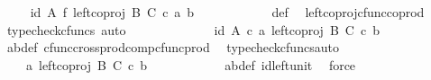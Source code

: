 \begin{isabellebody}
\ \isamarkupfalse%
\ {\isachardoublequoteopen}{\isachardot}{\kern0pt}{\isachardot}{\kern0pt}{\isachardot}{\kern0pt}\ {\isacharequal}{\kern0pt}\ {\isacharparenleft}{\kern0pt}id\ A\ {\isasymtimes}\isactrlsub f\ left{\isacharunderscore}{\kern0pt}coproj\ B\ C{\isacharparenright}{\kern0pt}\ {\isasymcirc}\isactrlsub c\ {\isasymlangle}a{\isacharprime}{\kern0pt}{\isacharcomma}{\kern0pt}\ b{\isacharprime}{\kern0pt}{\isasymrangle}{\isachardoublequoteclose}\isanewline
\ \ \ \ \ \ \ \ \ \ \isamarkupfalse%
\ {\isasymphi}{\isacharunderscore}{\kern0pt}def\ \isamarkupfalse%
\ left{\isacharunderscore}{\kern0pt}coproj{\isacharunderscore}{\kern0pt}cfunc{\isacharunderscore}{\kern0pt}coprod\ \isamarkupfalse%
\ {\isacharparenleft}{\kern0pt}typecheck{\isacharunderscore}{\kern0pt}cfuncs{\isacharcomma}{\kern0pt}\ auto{\isacharparenright}{\kern0pt}\isanewline
\ \ \ \ \ \ \ \ \isamarkupfalse%
\ \isamarkupfalse%
\ {\isachardoublequoteopen}{\isachardot}{\kern0pt}{\isachardot}{\kern0pt}{\isachardot}{\kern0pt}\ {\isacharequal}{\kern0pt}\ {\isasymlangle}id\ A\ {\isasymcirc}\isactrlsub c\ a{\isacharprime}{\kern0pt}{\isacharcomma}{\kern0pt}\ left{\isacharunderscore}{\kern0pt}coproj\ B\ C\ {\isasymcirc}\isactrlsub c\ b{\isacharprime}{\kern0pt}{\isasymrangle}{\isachardoublequoteclose}\isanewline
\ \ \ \ \ \ \ \ \ \ \isamarkupfalse%
\ a{\isacharprime}{\kern0pt}b{\isacharprime}{\kern0pt}{\isacharunderscore}{\kern0pt}def\ cfunc{\isacharunderscore}{\kern0pt}cross{\isacharunderscore}{\kern0pt}prod{\isacharunderscore}{\kern0pt}comp{\isacharunderscore}{\kern0pt}cfunc{\isacharunderscore}{\kern0pt}prod\ \isamarkupfalse%
\ {\isacharparenleft}{\kern0pt}typecheck{\isacharunderscore}{\kern0pt}cfuncs{\isacharcomma}{\kern0pt}auto{\isacharparenright}{\kern0pt}\isanewline
\ \ \ \ \ \ \ \ \isamarkupfalse%
\ \isamarkupfalse%
\ {\isachardoublequoteopen}{\isachardot}{\kern0pt}{\isachardot}{\kern0pt}{\isachardot}{\kern0pt}\ {\isacharequal}{\kern0pt}\ \ {\isasymlangle}a{\isacharprime}{\kern0pt}{\isacharcomma}{\kern0pt}\ left{\isacharunderscore}{\kern0pt}coproj\ B\ C\ {\isasymcirc}\isactrlsub c\ b{\isacharprime}{\kern0pt}{\isasymrangle}{\isachardoublequoteclose}\isanewline
\ \ \ \ \ \ \ \ \ \ \isamarkupfalse%
\ a{\isacharprime}{\kern0pt}b{\isacharprime}{\kern0pt}{\isacharunderscore}{\kern0pt}def\ id{\isacharunderscore}{\kern0pt}left{\isacharunderscore}{\kern0pt}unit{}\ \isamarkupfalse%
\ force\isanewline

\end{isabellebody}
